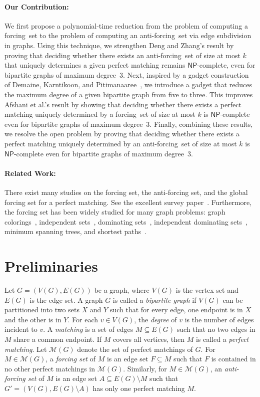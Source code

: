\documentclass[a4paper,10pt]{article}
\newcommand{\NPc}{$\mathsf{NP}$-complete}
\newcommand{\FS}{\rm forcing~set}
\newcommand{\AFS}{\rm anti-forcing~set}
\begin{document}
\paragraph{\bf Our Contribution:}
We first propose a polynomial-time reduction from the problem of computing a {\FS} to the problem of computing an {\AFS} via edge subdivision in graphs.
Using this technique, we strengthen Deng and Zhang's result by proving that deciding whether there exists an {\AFS} of size at most $k$ that uniquely determines a given perfect matching remains {\NPc}, even for bipartite graphs of maximum degree~$3$.
Next, inspired by a gadget construction of Demaine, Karntikoon, and Pitimanaaree~\cite{DemaineKP25}, we introduce a gadget that reduces the maximum degree of a given bipartite graph from five to three.
This improves Afshani et al.'s result by showing that deciding whether there exists a perfect matching uniquely determined by a {\FS} of size at most $k$ is {\NPc} even for bipartite graphs of maximum degree~$3$.
Finally, combining these results, we resolve the open problem by proving that deciding whether there exists a perfect matching uniquely determined by an {\AFS} of size at most $k$ is {\NPc} even for bipartite graphs of maximum degree~$3$.

\paragraph{\bf Related Work:}
There exist many studies on the forcing set, the anti-forcing set, and the global forcing set for a perfect matching.
See the excellent survey paper~\cite{ZhangHLZ25}.
Furthermore, the forcing set has been widely studied for many graph problems: graph colorings~\cite{Harary07}, independent sets~\cite{Larson13}, dominating sets~\cite{Chartrand97}, independent dominating sets~\cite{Armada19}, minimum spanning trees, and shortest paths~\cite{GKOS26}.

\section{Preliminaries}
Let $G = (V(G), E(G))$ be a graph, where $V(G)$ is the vertex set and $E(G)$ is the edge set.
A graph $G$ is called a \emph{bipartite graph} if $V(G)$ can be partitioned into two sets $X$ and $Y$ such that for every edge, one endpoint is in $X$ and the other is in $Y$.
For each $v \in V(G)$, the \emph{degree} of $v$ is the number of edges incident to $v$.
A \emph{matching} is a set of edges $M \subseteq E(G)$ such that no two edges in $M$ share a common endpoint.
If $M$ covers all vertices, then $M$ is called a \emph{perfect matching}.
Let $\mathcal{M}(G)$ denote the set of perfect matchings of $G$.
For $M \in \mathcal{M}(G)$, a \emph{forcing set} of $M$ is an edge set $F \subseteq M$ such that $F$ is contained in no other perfect matchings in $\mathcal{M}(G)$.
Similarly, for $M \in \mathcal{M}(G)$, an \emph{anti-forcing set} of $M$ is an edge set $A \subseteq E(G) \setminus M$ such that $G'=(V(G), E(G)\setminus A)$ has only one perfect matching $M$.
\end{document}
